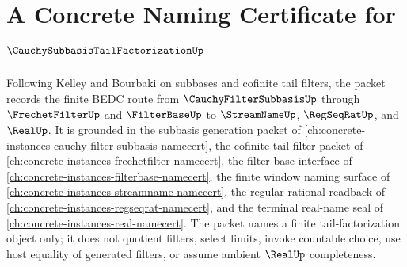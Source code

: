\chapter{A Concrete Naming Certificate for $\CauchySubbasisTailFactorizationUp$}
\label{ch:concrete-instances-cauchy-subbasis-tail-factorization-namecert}

Following Kelley and Bourbaki on subbases and cofinite tail filters, the packet records the finite BEDC route from $\CauchyFilterSubbasisUp$ through $\FrechetFilterUp$ and $\FilterBaseUp$ to $\StreamNameUp$, $\RegSeqRatUp$, and $\RealUp$. It is grounded in the subbasis generation packet of \autoref{ch:concrete-instances-cauchy-filter-subbasis-namecert}, the cofinite-tail filter packet of \autoref{ch:concrete-instances-frechetfilter-namecert}, the filter-base interface of \autoref{ch:concrete-instances-filterbase-namecert}, the finite window naming surface of \autoref{ch:concrete-instances-streamname-namecert}, the regular rational readback of \autoref{ch:concrete-instances-regseqrat-namecert}, and the terminal real-name seal of \autoref{ch:concrete-instances-real-namecert}. The packet names a finite tail-factorization object only; it does not quotient filters, select limits, invoke countable choice, use host equality of generated filters, or assume ambient $\RealUp$ completeness.

